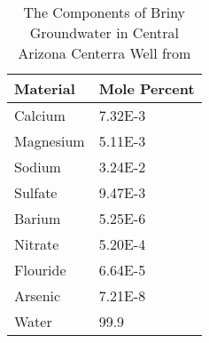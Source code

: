 \begin{table}[h!]
\centering
\caption{The Components of Briny Groundwater in Central Arizona Centerra Well from \cite{USBureauofReclamation2006}}
\label{ArizonaWater}
\begin{tabular}{|l|l|}
\hline
\textbf{Material}                                                & \textbf{Mole Percent} \\ \hline
Calcium  & 7.32E-3     \\ \hline
Magnesium & 5.11E-3      \\ \hline
Sodium & 3.24E-2\\ \hline
Sulfate & 9.47E-3 \\ \hline
Barium & 5.25E-6 \\ \hline
Nitrate & 5.20E-4 \\ \hline
Flouride & 6.64E-5 \\ \hline
Arsenic & 7.21E-8 \\ \hline
Water                                                      & 99.9         \\ \hline
\end{tabular}
\end{table}

